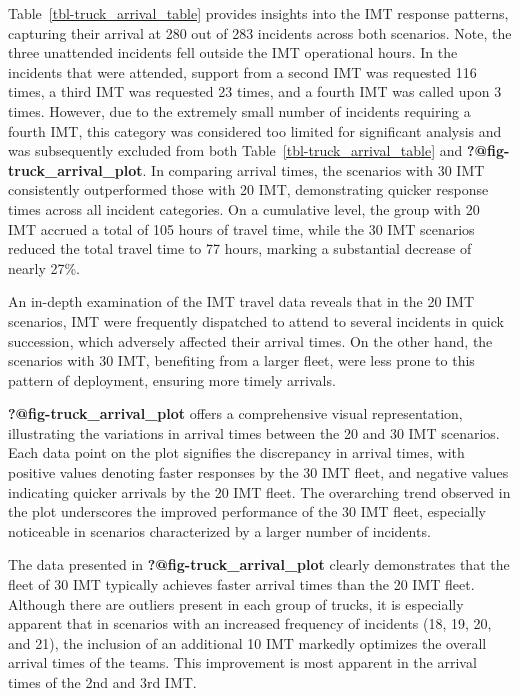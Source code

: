 \documentclass[fancy, oneside, mastersfancy, ms]{byuthesis}
\begin{document}
Table~\ref{tbl-truck_arrival_table} provides insights into the IMT
response patterns, capturing their arrival at 280 out of 283 incidents
across both scenarios. Note, the three unattended incidents fell outside
the IMT operational hours. In the incidents that were attended, support
from a second IMT was requested 116 times, a third IMT was requested 23
times, and a fourth IMT was called upon 3 times. However, due to the
extremely small number of incidents requiring a fourth IMT, this
category was considered too limited for significant analysis and was
subsequently excluded from both Table~\ref{tbl-truck_arrival_table} and
\textbf{?@fig-truck\_arrival\_plot}. In comparing arrival times, the
scenarios with 30 IMT consistently outperformed those with 20 IMT,
demonstrating quicker response times across all incident categories. On
a cumulative level, the group with 20 IMT accrued a total of 105 hours
of travel time, while the 30 IMT scenarios reduced the total travel time
to 77 hours, marking a substantial decrease of nearly 27\%.

An in-depth examination of the IMT travel data reveals that in the 20
IMT scenarios, IMT were frequently dispatched to attend to several
incidents in quick succession, which adversely affected their arrival
times. On the other hand, the scenarios with 30 IMT, benefiting from a
larger fleet, were less prone to this pattern of deployment, ensuring
more timely arrivals.

\textbf{?@fig-truck\_arrival\_plot} offers a comprehensive visual
representation, illustrating the variations in arrival times between the
20 and 30 IMT scenarios. Each data point on the plot signifies the
discrepancy in arrival times, with positive values denoting faster
responses by the 30 IMT fleet, and negative values indicating quicker
arrivals by the 20 IMT fleet. The overarching trend observed in the plot
underscores the improved performance of the 30 IMT fleet, especially
noticeable in scenarios characterized by a larger number of incidents.

The data presented in \textbf{?@fig-truck\_arrival\_plot} clearly
demonstrates that the fleet of 30 IMT typically achieves faster arrival
times than the 20 IMT fleet. Although there are outliers present in each
group of trucks, it is especially apparent that in scenarios with an
increased frequency of incidents (18, 19, 20, and 21), the inclusion of
an additional 10 IMT markedly optimizes the overall arrival times of the
teams. This improvement is most apparent in the arrival times of the 2nd
and 3rd IMT.
\end{document}
